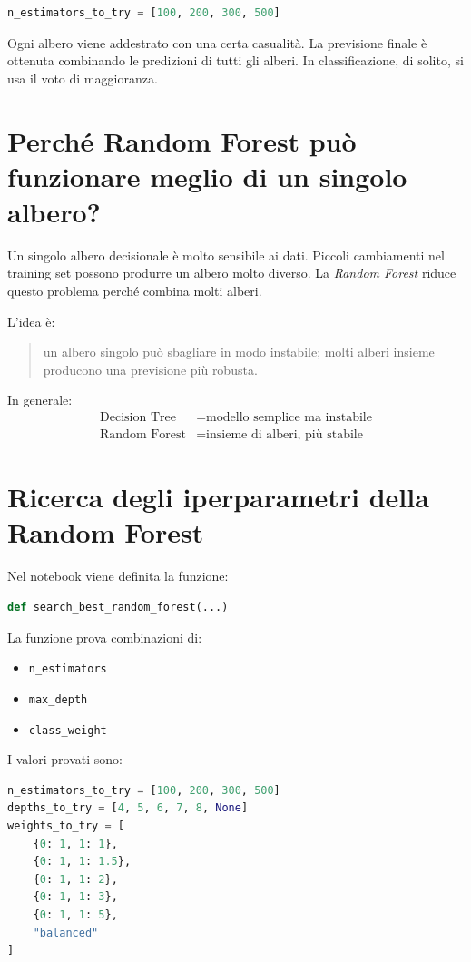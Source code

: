 \documentclass[11pt,a4paper]{article}
\begin{document}
\begin{lstlisting}[language=Python]
n_estimators_to_try = [100, 200, 300, 500]
\end{lstlisting}

Ogni albero viene addestrato con una certa casualità. La previsione finale è ottenuta combinando le predizioni di tutti gli alberi. In classificazione, di solito, si usa il voto di maggioranza.

\section{Perché Random Forest può funzionare meglio di un singolo albero?}
Un singolo albero decisionale è molto sensibile ai dati. Piccoli cambiamenti nel training set possono produrre un albero molto diverso. La \textit{Random Forest} riduce questo problema perché combina molti alberi.

L'idea è:
\begin{quote}
    un albero singolo può sbagliare in modo instabile; molti alberi insieme producono una previsione più robusta.
\end{quote}

In generale:
\begin{align*}
    \text{Decision Tree} &= \text{modello semplice ma instabile} \\
    \text{Random Forest} &= \text{insieme di alberi, più stabile}
\end{align*}

\section{Ricerca degli iperparametri della Random Forest}
Nel notebook viene definita la funzione:
\begin{lstlisting}[language=Python]
def search_best_random_forest(...)
\end{lstlisting}

La funzione prova combinazioni di:
\begin{itemize}
    \item \texttt{n\_estimators}
    \item \texttt{max\_depth}
    \item \texttt{class\_weight}
\end{itemize}

I valori provati sono:
\begin{lstlisting}[language=Python]
n_estimators_to_try = [100, 200, 300, 500]
depths_to_try = [4, 5, 6, 7, 8, None]
weights_to_try = [
    {0: 1, 1: 1},
    {0: 1, 1: 1.5},
    {0: 1, 1: 2},
    {0: 1, 1: 3},
    {0: 1, 1: 5},
    "balanced"
]
\end{lstlisting}
\end{document}
